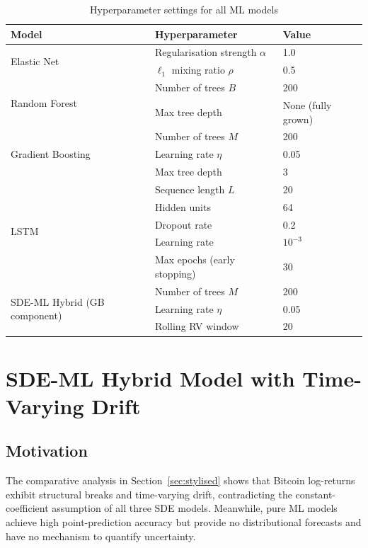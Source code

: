 \documentclass[12pt, a4paper, oneside]{report}
\theoremstyle{plain}
\theoremstyle{definition}
\theoremstyle{remark}
\begin{document}
\begin{table}[H]
\begin{singlespace}
\fontsize{10}{11}\selectfont
\caption{Hyperparameter settings for all ML models}
\label{tab:hyperparams}
\begin{tabular}{@{}lll@{}}
\toprule
Model & Hyperparameter & Value \\
\midrule
\multirow{2}{*}{Elastic Net}
  & Regularisation strength $\alpha$ & 1.0 \\
  & $\ell_1$ mixing ratio $\rho$ & 0.5 \\[4pt]
\multirow{2}{*}{Random Forest}
  & Number of trees $B$ & 200 \\
  & Max tree depth & None (fully grown) \\[4pt]
\multirow{3}{*}{Gradient Boosting}
  & Number of trees $M$ & 200 \\
  & Learning rate $\eta$ & 0.05 \\
  & Max tree depth & 3 \\[4pt]
\multirow{5}{*}{LSTM}
  & Sequence length $L$ & 20 \\
  & Hidden units & 64 \\
  & Dropout rate & 0.2 \\
  & Learning rate & $10^{-3}$ \\
  & Max epochs (early stopping) & 30 \\[4pt]
\multirow{3}{*}{SDE-ML Hybrid (GB component)}
  & Number of trees $M$ & 200 \\
  & Learning rate $\eta$ & 0.05 \\
  & Rolling RV window & 20 \\
\bottomrule
\end{tabular}
\end{singlespace}
\end{table}

\section{SDE-ML Hybrid Model with Time-Varying Drift}
\label{sec:hybrid}

\subsection{Motivation}

The comparative analysis in Section~\ref{sec:stylised} shows that Bitcoin
log-returns exhibit structural breaks and time-varying drift, contradicting the
constant-coefficient assumption of all three SDE models.  Meanwhile, pure ML
models achieve high point-prediction accuracy but provide no distributional
forecasts and have no mechanism to quantify uncertainty.
\end{document}

